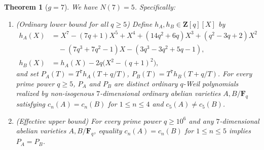 \documentclass[11pt]{amsart}
\newtheorem{theorem}{Theorem}[section]
\theoremstyle{remark}
\newcommand{\F}{\mathbf{F}}
\newcommand{\Z}{\mathbf{Z}}
\begin{document}
\begin{theorem}[$g = 7$]\label{thm:g7}
We have $N(7) = 5$. Specifically:
\begin{enumerate}
\item \emph{(Ordinary lower bound for all $q \ge 5$)} Define $h_A, h_B \in \Z[q][X]$ by
\begin{align*}
h_A(X) &= X^7 - (7q + 1) X^5 + X^4 + (14q^2 + 6q) X^3 + (q^2 - 3q + 2) X^2 \\
       &\quad - (7q^3 + 7q^2 - 1) X - (3q^3 - 3q^2 + 5q - 1), \\
h_B(X) &= h_A(X) - 2q\bigl(X^2 - (q + 1)^2\bigr),
\end{align*}
and set $P_A(T) = T^7 h_A(T + q/T)$, $P_B(T) = T^7 h_B(T + q/T)$. For every prime power $q \ge 5$, $P_A$ and $P_B$ are distinct ordinary $q$-Weil polynomials realized by non-isogenous $7$-dimensional ordinary abelian varieties $A, B / \F_q$ satisfying $c_n(A) = c_n(B)$ for $1 \le n \le 4$ and $c_5(A) \ne c_5(B)$.
\item \emph{(Effective upper bound)} For every prime power $q \ge 10^6$ and any $7$-dimensional abelian varieties $A, B / \F_q$, equality $c_n(A) = c_n(B)$ for $1 \le n \le 5$ implies $P_A = P_B$.
\end{enumerate}
\end{theorem}
\end{document}

